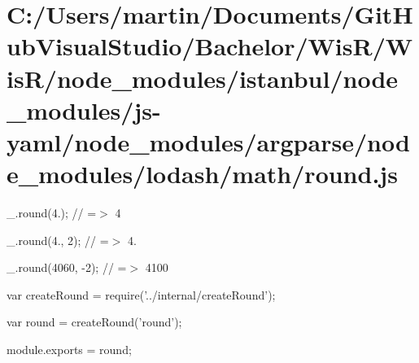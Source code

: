 \hypertarget{_c_1_2_users_2martin_2_documents_2_git_hub_visual_studio_2_bachelor_2_wis_r_2_wis_r_2node_moduleb21f20224753b287ce9892c77374285e}{}\section{C\+:/\+Users/martin/\+Documents/\+Git\+Hub\+Visual\+Studio/\+Bachelor/\+Wis\+R/\+Wis\+R/node\+\_\+modules/istanbul/node\+\_\+modules/js-\/yaml/node\+\_\+modules/argparse/node\+\_\+modules/lodash/math/round.\+js}
\+\_\+.\+round(4.); // =$>$ 4

\+\_\+.\+round(4., 2); // =$>$ 4.

\+\_\+.\+round(4060, -\/2); // =$>$ 4100


\begin{DoxyCodeInclude}
var createRound = require(\textcolor{stringliteral}{'../internal/createRound'});

var round = createRound(\textcolor{stringliteral}{'round'});

module.exports = round;
\end{DoxyCodeInclude}
 